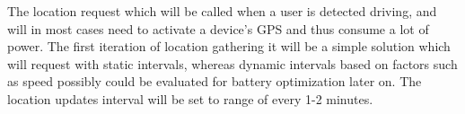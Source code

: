 The location request which will be called when a user is detected driving, and will in most cases need to activate a device's GPS and thus consume a lot of power.
The first iteration of location gathering it will be a simple solution which will request with static intervals, whereas dynamic intervals based on factors such as speed possibly could be evaluated for battery optimization later on.
The location updates interval will be set to range of every 1-2 minutes.

